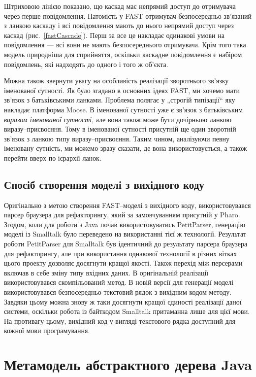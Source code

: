 \documentclass[12pt,a4paper]{article}
\begin{document}
Штриховою лінією показано, що каскад має непрямий доступ до отримувача через перше повідомлення. Натомість у FAST отримувач безпосередньо зв'язаний з ланкою каскаду і всі повідомлення мають до нього непрямий доступ через каскад (рис.~\ref{fastCascade}). Перш за все це накладає одинакові умови на повідомлення --- всі вони не мають безпосереднього отримувача. Крім того така модель природніша для сприйняття, оскільки каскадне повідомлення є набіром повідомлень, які надходять до одного і того ж об'єкта.

Можна також звернути увагу на особливість реалізації зворотнього зв'язку іменованої сутності. Як було згадано в основних ідеях FAST, ми хочемо мати зв'язок з батьківськими ланками. Проблема полягає у „строгій типізації“ яку накладає платформа Moose. В іменованої сутності уже є зв'язок з батьківським \emph{виразом іменованої сутності}, але вона також може бути дочірньою ланкою виразу--присвоєння. Тому в іменованої сутності присутній ще один зворотній зв'язок з ланкою типу виразу--присвоєння. Таким чином, аналізуючи певну іменовану сутність, ми можемо зразу сказати, де вона використовується, а також перейти вверх по ієрархії ланок. 

\subsection{Спосіб створення моделі з вихідного коду}
Оригінально з метою створення FAST--моделі з вихідного коду, використовувався парсер браузера для рефакторингу, який за замовчуванням присутній у Pharo. Згодом, коли для роботи з Java почав використовуватись PetitParser, генерацію моделі із Smalltalk було переведено на використанні тієї ж технології. Результат роботи PetitParser для Smalltalk був ідентичний до результату парсера браузера для рефакторингу, але при використання однакової технології в різних вітках цього проекту дозволяє досягнути кращої якості. Також перехід між персерами включав в себе зміну типу вхідних даних. В оригінальній реалізації використовувався скомпільований метод. В новій версії для генерації моделі використовувався безпосередньо текстовий рядок з вихідним кодом методу. Завдяки цьому можна знову ж таки досягнути кращої єдиності реалізації даної системи, оскільки робота із байткодом Smalltalk притаманна лише для цієї мови. На противагу цьому, вихідний код у вигляді текстового рядка доступний для кожної мови програмування.

\clearpage

\section{Метамодель абстрактного дерева Java}
\end{document}
